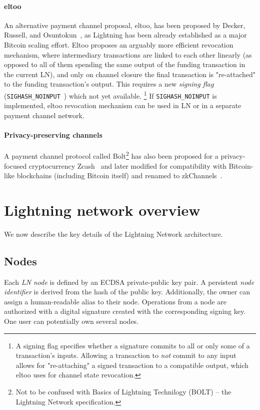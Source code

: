 \paragraph{eltoo}
An alternative payment channel proposal, eltoo, has been proposed by Decker, Russell, and Osuntokun~\cite{Decker2018}, as Lightning has been already established as a major Bitcoin scaling effort.
Eltoo proposes an arguably more efficient revocation mechanism, where intermediary transactions are linked to each other linearly (as opposed to all of them spending the same output of the funding transaction in the current LN), and only on channel closure the final transaction is "re-attached" to the funding transaction's output.
This requires a new \textit{signing flag} (\texttt{SIGHASH\_NOINPUT}~\cite{Decker2017}) which not yet available.
\footnote{A signing flag specifies whether a signature commits to all or only some of a transaction's inputs. Allowing a transaction to \textit{not} commit to any input allows for "re-attaching" a signed transaction to a compatible output, which eltoo uses for channel state revocation.}
If \texttt{SIGHASH\_NOINPUT} is implemented, eltoo revocation mechanism can be used in LN or in a separate payment channel network.

\paragraph{Privacy-preserving channels}
A payment channel protocol called Bolt\footnote{Not to be confused with Basics of Lightning Technilogy (BOLT) -- the Lightning Network specification.} has also been proposed for a privacy-focused cryptocurrency Zcash~\cite{Green2017} and later modified for compatibility with Bitcoin-like blockchains (including Bitcoin itself) and renamed to zkChannels~\cite{Akinyele2020}.



\section{Lightning network overview}
\label{sec:LightningOverview}

We now describe the key details of the Lightning Network architecture.

\subsection{Nodes}

Each \textit{LN node} is defined by an ECDSA private-public key pair.
A persistent \textit{node identifier} is derived from the hash of the public key. 
Additionally, the owner can assign a human-readable alias to their node.
Operations from a node are authorized with a digital signature created with the corresponding signing key.
One user can potentially own several nodes.

